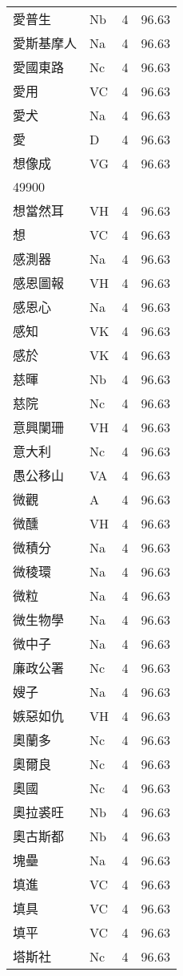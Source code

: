 \documentclass[twocolumn]{book}
\begin{document}
\begin{supertabular}{llrr}
愛普生 & Nb & 4 &  96.63\\
愛斯基摩人 & Na & 4 &  96.63\\
愛國東路 & Nc & 4 &  96.63\\
愛用 & VC & 4 &  96.63\\
愛犬 & Na & 4 &  96.63\\
愛 & D & 4 &  96.63\\
想像成 & VG & 4 &  96.63\\
49900\\
想當然耳 & VH & 4 &  96.63\\
想 & VC & 4 &  96.63\\
感測器 & Na & 4 &  96.63\\
感恩圖報 & VH & 4 &  96.63\\
感恩心 & Na & 4 &  96.63\\
感知 & VK & 4 &  96.63\\
感於 & VK & 4 &  96.63\\
慈暉 & Nb & 4 &  96.63\\
慈院 & Nc & 4 &  96.63\\
意興闌珊 & VH & 4 &  96.63\\
意大利 & Nc & 4 &  96.63\\
愚公移山 & VA & 4 &  96.63\\
微觀 & A & 4 &  96.63\\
微醺 & VH & 4 &  96.63\\
微積分 & Na & 4 &  96.63\\
微稜環 & Na & 4 &  96.63\\
微粒 & Na & 4 &  96.63\\
微生物學 & Na & 4 &  96.63\\
微中子 & Na & 4 &  96.63\\
廉政公署 & Nc & 4 &  96.63\\
嫂子 & Na & 4 &  96.63\\
嫉惡如仇 & VH & 4 &  96.63\\
奧蘭多 & Nc & 4 &  96.63\\
奧爾良 & Nc & 4 &  96.63\\
奧國 & Nc & 4 &  96.63\\
奧拉裘旺 & Nb & 4 &  96.63\\
奧古斯都 & Nb & 4 &  96.63\\
塊壘 & Na & 4 &  96.63\\
填進 & VC & 4 &  96.63\\
填具 & VC & 4 &  96.63\\
填平 & VC & 4 &  96.63\\
塔斯社 & Nc & 4 &  96.63\\

\end{supertabular}
\end{document}
